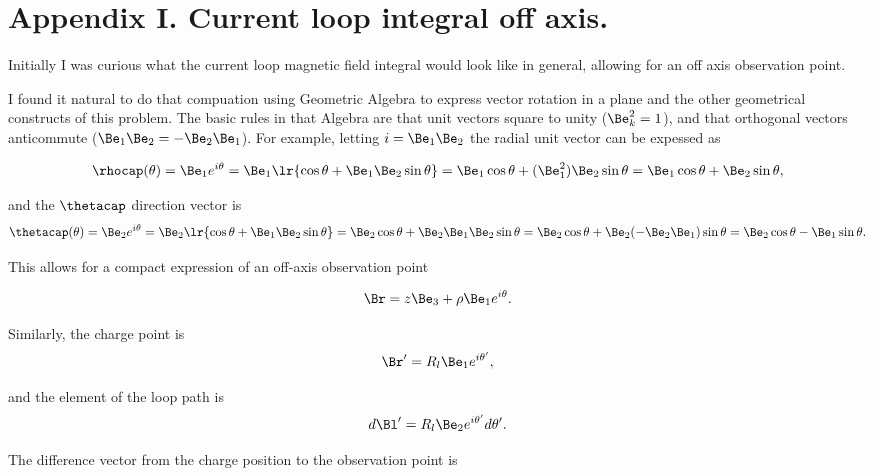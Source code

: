 \section{Appendix I.  Current loop integral off axis.}

Initially I was curious what the current loop magnetic field integral would look like in general, allowing for an off axis observation point.

I found it natural to do that compuation using Geometric Algebra to express vector rotation in a plane and the other geometrical constructs of this problem.  The basic rules in that Algebra are that unit vectors square to unity (\(\Be_k^2 = 1 \)), and that orthogonal vectors anticommute (\( \Be_1 \Be_2 = -\Be_2 \Be_1 \)).  For example, letting \( i = \Be_1 \Be_2 \) the radial unit vector can be expessed as

\begin{dmath}\label{eqn:emtProblemSet3Problem2:160}
\rhocap(\theta)
=
\Be_1 e^{i \theta}
= \Be_1 \lr{ \cos\theta + \Be_1 \Be_2 \sin\theta } 
= \Be_1 \cos\theta + (\Be_1^2) \Be_2 \sin\theta
= \Be_1 \cos\theta + \Be_2 \sin\theta,
\end{dmath}

and the \( \thetacap \) direction vector is
\begin{dmath}\label{eqn:emtProblemSet3Appendix:n}
\thetacap(\theta)
=
\Be_2 e^{i \theta}
= \Be_2 \lr{ \cos\theta + \Be_1 \Be_2 \sin\theta } 
= \Be_2 \cos\theta + \Be_2 \Be_1 \Be_2 \sin\theta
= \Be_2 \cos\theta + \Be_2 (-\Be_2 \Be_1) \sin\theta
= \Be_2 \cos\theta - \Be_1 \sin\theta.
\end{dmath}

This allows for a compact expression of an off-axis observation point

\begin{dmath}\label{eqn:emtProblemSet3Problem2:60}
\Br = z \Be_3 + \rho \Be_1 e^{i\theta}.
\end{dmath}

Similarly, the charge point is
\begin{dmath}\label{eqn:emtProblemSet3Problem2:80}
\Br' = R_l \Be_1 e^{i \theta'},
\end{dmath}

and the element of the loop path is
\begin{dmath}\label{eqn:emtProblemSet3Problem2:100}
d\Bl' = R_l \Be_2 e^{i\theta'} d\theta'.
\end{dmath}

The difference vector from the charge position to the observation point is

